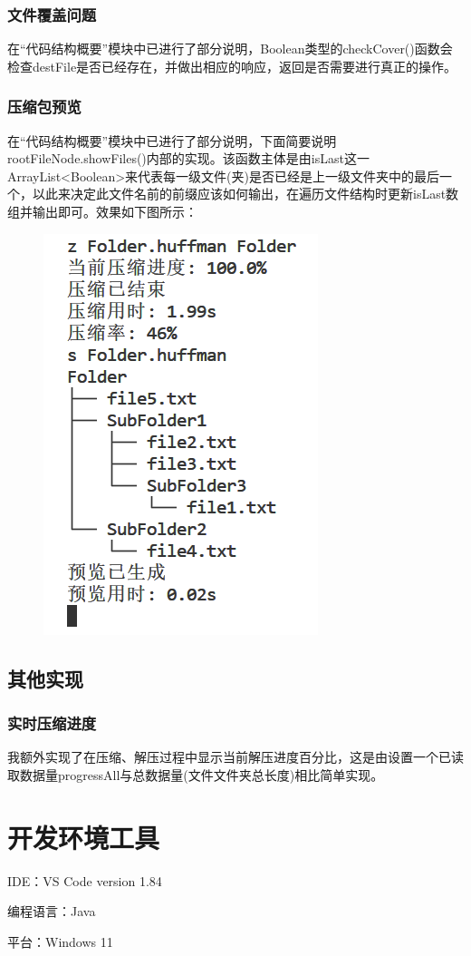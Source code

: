 \documentclass[11pt,a4paper]{article}
\begin{document}
\subsubsection*{文件覆盖问题}
\par{在“代码结构概要”模块中已进行了部分说明，Boolean类型的checkCover()函数会检查destFile是否已经存在，并做出相应的响应，返回是否需要进行真正的操作。}
\subsubsection*{压缩包预览}
\par{在“代码结构概要”模块中已进行了部分说明，下面简要说明rootFileNode.showFiles()内部的实现。该函数主体是由isLast这一ArrayList<Boolean>来代表每一级文件(夹)是否已经是上一级文件夹中的最后一个，以此来决定此文件名前的前缀应该如何输出，在遍历文件结构时更新isLast数组并输出即可。效果如下图所示：}
\begin{figure}[H]
    \centering
    \includegraphics[width=0.3\linewidth]{1.png}
\end{figure}
\subsection*{其他实现}
\subsubsection*{实时压缩进度}
\par{我额外实现了在压缩、解压过程中显示当前解压进度百分比，这是由设置一个已读取数据量progressAll与总数据量(文件文件夹总长度)相比简单实现。}
\section{开发环境工具}
\par{IDE：VS Code version 1.84}
\par{编程语言：Java}
\par{平台：Windows 11}
\end{document}
